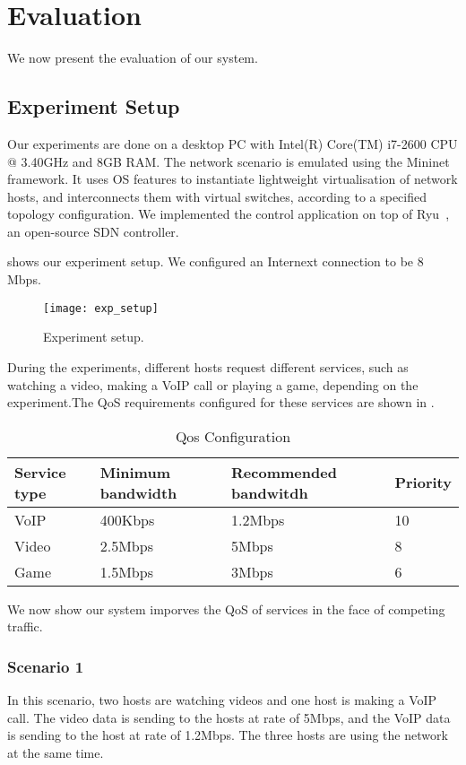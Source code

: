 \section{Evaluation}
\label{sect:experiment}
We now present the evaluation of our system. 

\subsection{Experiment Setup}
Our experiments are done on a desktop PC with Intel(R) Core(TM) i7-2600 CPU @ 3.40GHz and 8GB RAM. The network scenario is emulated using the Mininet~\cite{mininet} framework.
It uses OS features to instantiate lightweight virtualisation of network hosts, and interconnects them with virtual switches, according to a specified topology configuration.
We implemented the control application on top of Ryu~\cite{ryu}, an open-source SDN controller.

 shows our experiment setup. We configured an Internext connection to be 8 Mbps.

\begin{figure}[htb]
\centering
\texttt{[image: exp\_setup]}
\caption{Experiment setup.}
\label{fig:setup}
\end{figure}

During the experiments, different hosts request different services, such as watching a video, making a VoIP call or playing a game, depending on the experiment.The QoS requirements configured for these services are shown in . 

\begin{table}[htb]
\scriptsize
\caption{Qos Configuration}
\begin{tabular}{|l|l|l|l|}
\hline Service type & Minimum bandwidth & Recommended bandwitdh & Priority \\
\hline
\hline VoIP & 400Kbps & 1.2Mbps & 10 \\
\hline Video & 2.5Mbps & 5Mbps & 8  \\
\hline Game & 1.5Mbps & 3Mbps & 6  \\
\hline
\end{tabular}
\label{table:qos_config}
\end{table}

We now show our system imporves the QoS of services in the face of competing traffic.
\subsubsection{Scenario 1}
In this scenario, two hosts are watching videos and one host is making a VoIP call.
The video data is sending to the hosts at rate of 5Mbps, and the VoIP data is sending to the host at rate of 1.2Mbps.
The three hosts are using the network at the same time.  

